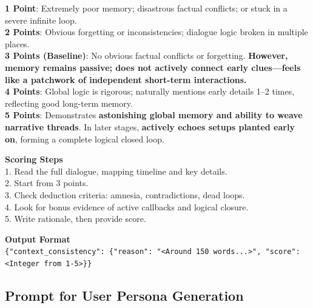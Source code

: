 \begin{tcolorbox}[
    breakable,
    colback=MyWordColor1,
    colframe=black,
    boxrule=0.6pt,
    arc=1.5mm,
    title={\textbf{DynSess-Eval Prompt: Contextual Coherence}},
    fontupper=\small
]
\textbf{1 Point}: Extremely poor memory; disastrous factual conflicts; or stuck in a severe infinite loop.\\
\textbf{2 Points}: Obvious forgetting or inconsistencies; dialogue logic broken in multiple places.\\
\textbf{3 Points (Baseline)}: No obvious factual conflicts or forgetting. \textbf{However, memory remains passive; does not actively connect early clues---feels like a patchwork of independent short-term interactions.}\\
\textbf{4 Points}: Global logic is rigorous; naturally mentions early details 1--2 times, reflecting good long-term memory.\\
\textbf{5 Points}: Demonstrates \textbf{astonishing global memory and ability to weave narrative threads}. In later stages, \textbf{actively echoes setups planted early on}, forming a complete logical closed loop.

\textbf{Scoring Steps}\\
1. Read the full dialogue, mapping timeline and key details.\\
2. Start from 3 points.\\
3. Check deduction criteria: amnesia, contradictions, dead loops.\\
4. Look for bonus evidence of active callbacks and logical closure.\\
5. Write rationale, then provide score.

\textbf{Output Format}\\
\texttt{\{"context\_consistency": \{"reason": "<Around 150 words...>", "score": <Integer from 1-5>\}\}}
\end{tcolorbox}

\subsection{Prompt for User Persona Generation}
\label{app:prompt_user_persona}

